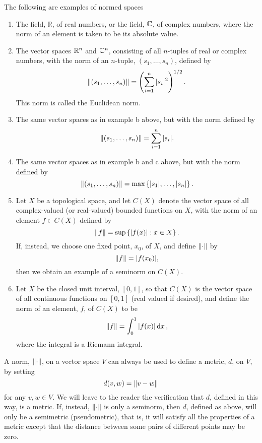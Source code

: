 \begin{examples}
The following are examples of normed spaces
\begin{enumerate}
    \item The field, $\mathbb{R}$, of real numbers, or the field, $\mathbb{C}$, of complex numbers, where the norm of an element is taken to be its absolute value.
    
    \item The vector spaces $\mathbb{R}^n$ and $\mathbb{C}^n$, consisting of all $n$-tuples of real or complex numbers, with the norm of an $n$-tuple, $(s_1,\dots,s_n)$, defined by $$\norm{(s_1,\dots,s_n)}=\left(\sum_{i=1}^n|s_i|^2\right)^{1/2}.$$ This norm is called the Euclidean norm.
    
    \item The same vector spaces as in example b above, but with the norm defined by $$\norm{(s_1,\dots,s_n)}=\sum_{i=1}^n|s_i|.$$
    
    \item The same vector spaces as in example b and c above, but with the norm defined by $$\norm{(s_1,\dots,s_n)}=\max\left\{|s_1|,\dots,|s_n|\right\}.$$
    
    \item Let $X$ be a topological space, and let $C(X)$ denote the vector space of all complex-valued (or real-valued) bounded functions on $X$, with the norm of an element $f\in C(X)$ defined by $$\norm{f}=\sup\left\{|f(x)|:x\in X\right\}.$$ If, instead, we choose one fixed point, $x_0$, of $X$, and define $\norm{\cdot}$ by $$\norm{f}=|f(x_0)|,$$ then we obtain an example of a seminorm on $C(X)$.
    
    \item Let $X$ be the closed unit interval, $[0,1]$, so that $C(X)$ is the vector space of all continuous functions on $[0,1]$ (real valued if desired), and define the norm of an element, $f$, of $C(X)$ to be $$\norm{f}=\int_0^1|f(x)|\dd{x},$$ where the integral is a Riemann integral.
\end{enumerate}
\end{examples}

A norm, $\norm{\cdot}$, on a vector space $V$ can always be used to define a metric, $d$, on $V$, by setting $$d(v,w)=\norm{v-w}$$ for any $v,w\in V$. We will leave to the reader the verification that $d$, defined in this way, is a metric. If, instead, $\norm{\cdot}$ is only a seminorm, then $d$, defined as above, will only be a semimetric (pseudometric), that is, it will satisfy all the properties of a metric except that the distance between some pairs of different points may be zero.

